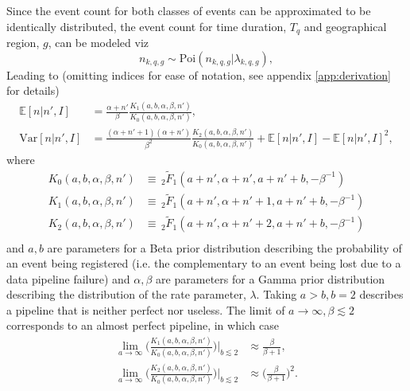\begin{example}
	Since the event count for both classes of events can be approximated to be identically distributed, the event count for time duration, $T_q$ and geographical region, $g$, can be modeled viz
	\begin{equation}
		n_{k,q,g} \sim \text{Poi}(n_{k,q,g}|\lambda_{k,q,g}),
	\end{equation}
	Leading to (omitting indices for ease of notation, see appendix \ref{app:derivation} for details)
	\begin{equation}
		\begin{split}
			\mathbb{E}[n|n',I] &=\frac{\alpha+n'}{\beta}\frac{ K_1(a,b,\alpha,\beta,n')}{K_0(a,b,\alpha,\beta,n')}, \\
			\text{Var}[n|n',I]&=\frac{(\alpha+n'+1)(\alpha+n')}{\beta^2}\frac{K_2(a,b,\alpha,\beta,n') }{K_0(a,b,\alpha,\beta,n')}+\mathbb{E}[n|n',I]-\mathbb{E}[n|n',I]^2,
		\end{split}
	\end{equation}
	where
	\begin{equation}
		\begin{split}
			K_0(a,b,\alpha,\beta,n') &\equiv \,_2\tilde{F}_1(a+n',\alpha+n',a+n'+b,-\beta^{-1})\\
			K_1(a,b,\alpha,\beta,n') &\equiv  \,_2\tilde{F}_1(a+n',\alpha+n'+1,a+n'+b,-\beta^{-1})\\
			K_2(a,b,\alpha,\beta,n') &\equiv \,_2\tilde{F}_1(a+n',\alpha+n'+2,a+n'+b,-\beta^{-1})\\
		\end{split}
	\end{equation}
	and $a,b$ are parameters for a Beta prior distribution describing the probability of an event being registered (i.e. the complementary to an event being lost due to a data pipeline failure) and $\alpha, \beta$ are parameters for a Gamma prior distribution describing the distribution of the rate parameter, $\lambda$. Taking $a>b, b=2$ describes a pipeline that is neither perfect nor useless. The limit of $a\rightarrow \infty, \beta \lesssim 2$ corresponds to an almost perfect pipeline, in which case
	\begin{equation}
		\begin{split}
			\lim\limits_{a\rightarrow \infty}\bigg(\frac{K_1(a,b,\alpha,\beta,n')}{K_0(a,b,\alpha,\beta,n')}\bigg)\bigg|_{b\lesssim 2}&\approx \frac{\beta}{\beta+1},\\
			\lim\limits_{a\rightarrow \infty}\bigg(\frac{K_2(a,b,\alpha,\beta,n')}{K_0(a,b,\alpha,\beta,n')}\bigg)\bigg|_{b\lesssim 2}&\approx \bigg(\frac{\beta}{\beta+1}\bigg)^2.\\

\end{split}
\end{equation}
\end{example}
